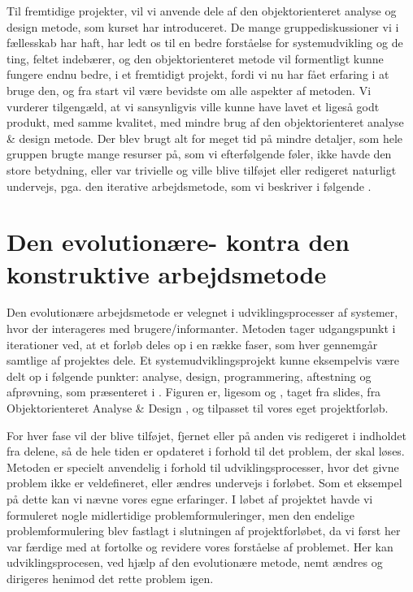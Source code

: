 Til fremtidige projekter, vil vi anvende dele af den objektorienteret analyse og design metode, som kurset har introduceret. De mange gruppediskussioner vi i fællesskab har haft, har ledt os til en bedre forståelse for systemudvikling og de ting, feltet indebærer, og den objektorienteret metode vil formentligt kunne fungere endnu bedre, i et fremtidigt projekt, fordi vi nu har fået erfaring i at bruge den, og fra start vil være bevidste om alle aspekter af metoden. Vi vurderer tilgengæld, at vi sansynligvis ville kunne have lavet et ligeså godt produkt, med samme kvalitet, med mindre brug af den objektorienteret analyse \& design metode. Der blev brugt alt for meget tid på mindre detaljer, som hele gruppen brugte mange resurser på, som vi efterfølgende føler, ikke havde den store betydning, eller var trivielle og ville blive tilføjet eller redigeret naturligt undervejs, pga. den iterative arbejdsmetode, som vi beskriver i følgende .


\section{Den evolutionære- kontra den konstruktive arbejdsmetode}
\label{sec:akadmiskevolutionaeremetode}

Den evolutionære arbejdsmetode er velegnet i udviklingsprocesser af systemer, hvor der interageres med brugere/informanter. 
Metoden tager udgangspunkt i iterationer ved, at et forløb deles op i en række faser, som hver gennemgår samtlige af projektes dele. Et systemudviklingsprojekt kunne eksempelvis være delt op i følgende punkter: analyse, design, programmering, aftestning og afprøvning, som præsenteret i . Figuren er, ligesom  og , taget fra slides, fra Objektorienteret Analyse \& Design \cite{ooadslide}, og tilpasset til vores eget projektforløb.

For hver fase vil der blive tilføjet, fjernet eller på anden vis redigeret i indholdet fra delene, så de hele tiden er opdateret i forhold til det problem, der skal løses. 
Metoden er specielt anvendelig i forhold til udviklingsprocesser, hvor det givne problem ikke er veldefineret, eller ændres undervejs i forløbet. 
Som et eksempel på dette kan vi nævne vores egne erfaringer. I løbet af projektet havde vi formuleret nogle midlertidige problemformuleringer, men den endelige problemformulering blev fastlagt i slutningen af projektforløbet, da vi først her var færdige med at fortolke og revidere vores forståelse af problemet.
Her kan udviklingsprocesen, ved hjælp af den evolutionære metode, nemt ændres og dirigeres henimod det rette problem igen.

